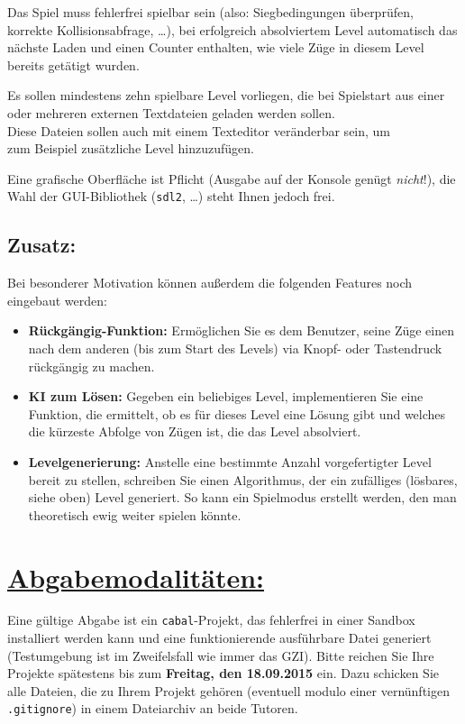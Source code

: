\documentclass[10pt,a4paper]{article}
\begin{document}
Das Spiel muss fehlerfrei spielbar sein (also: Siegbedingungen überprüfen, korrekte Kollisionsabfrage, \dots), bei erfolgreich absolviertem Level automatisch das nächste Laden und einen Counter enthalten, wie viele Züge in diesem Level bereits getätigt wurden.\bigskip

Es sollen mindestens zehn spielbare Level vorliegen, die bei Spielstart aus einer oder mehreren externen Textdateien geladen werden sollen.\\
Diese Dateien sollen auch mit einem Texteditor veränderbar sein, um\\ zum Beispiel zusätzliche Level hinzuzufügen.\bigskip
 
Eine grafische Oberfläche ist Pflicht (Ausgabe auf der Konsole  genügt \emph{nicht}!), die Wahl der GUI-Bibliothek (\texttt{sdl2}, \dots) steht Ihnen jedoch frei. 

\subsection*{Zusatz:}

Bei besonderer Motivation können außerdem die folgenden Features noch eingebaut werden:
 
\begin{itemize}
\item \textbf{Rückgängig-Funktion:} Ermöglichen Sie es dem Benutzer, seine Züge einen nach dem anderen (bis zum Start des Levels) via Knopf- oder Tastendruck rückgängig zu machen.

\item \textbf{KI zum Lösen:} Gegeben ein beliebiges Level, implementieren Sie eine Funktion, die ermittelt, ob es für dieses Level eine Lösung gibt und welches die kürzeste Abfolge von Zügen ist, die das Level absolviert.

\item \textbf{Levelgenerierung:} Anstelle eine bestimmte Anzahl vorgefertigter Level bereit zu stellen, schreiben Sie einen Algorithmus, der ein zufälliges (lösbares, siehe oben) Level generiert. So kann ein Spielmodus erstellt werden, den man theoretisch ewig weiter spielen könnte.
\end{itemize}

\section*{\underline{Abgabemodalitäten:}}

Eine gültige Abgabe ist ein \texttt{cabal}-Projekt, das fehlerfrei in einer Sandbox installiert werden kann und eine funktionierende ausführbare Datei generiert (Testumgebung ist im Zweifelsfall wie immer das GZI). Bitte reichen Sie Ihre Projekte spätestens bis zum \textbf{Freitag, den 18.09.2015} ein.
Dazu schicken Sie alle Dateien, die zu Ihrem Projekt gehören (eventuell modulo einer vernünftigen \texttt{.gitignore}) in einem Dateiarchiv an beide Tutoren.\bigskip
\end{document}
